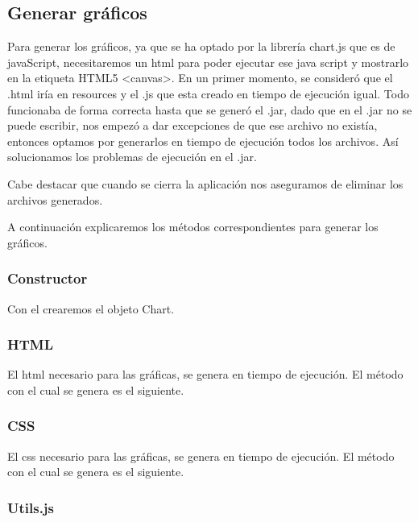 \subsection{Generar gráficos}\label{generar-graficos}

Para generar los gráficos, ya que se ha optado por la librería chart.js que es de javaScript, necesitaremos un html para poder ejecutar ese java script y mostrarlo en la etiqueta HTML5 <canvas>. En un primer momento, se consideró que el .html iría en resources y el .js que esta creado en tiempo de ejecución igual. Todo funcionaba de forma correcta hasta que se generó el .jar, dado que en el .jar no se puede escribir, nos empezó a dar excepciones de que ese archivo no existía, entonces optamos por generarlos en tiempo de ejecución todos los archivos. Así solucionamos los problemas de ejecución en el .jar.

Cabe destacar que cuando se cierra la aplicación nos aseguramos de eliminar los archivos generados.

A continuación explicaremos los métodos correspondientes para generar los gráficos.

\subsubsection{Constructor}\label{constructor}

Con el crearemos el objeto Chart.


\subsubsection{HTML}\label{html}

El html necesario para las gráficas, se genera en tiempo de ejecución. El método con el cual se genera es el siguiente.


\subsubsection{CSS}\label{css}

El css necesario para las gráficas, se genera en tiempo de ejecución. El método con el cual se genera es el siguiente.


\subsubsection{Utils.js}\label{utils}

